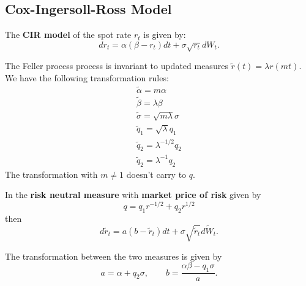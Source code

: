 \documentclass[10pt]{article}
\begin{document}
\subsection{Cox-Ingersoll-Ross Model}
\begin{outline}
  \1 The \textbf{CIR model} of the spot rate $r_t$ is given by:
  \begin{equation*}
    dr_t = \alpha(\beta - r_t)dt + \sigma\sqrt{r_t}dW_t.
  \end{equation*}

  \1 The Feller process process is invariant to updated measures
  $\tilde r(t) = \lambda r(mt)$. We have the following transformation rules:
  \begin{gather*}
    \tilde\alpha = m\alpha\\
    \tilde\beta = \lambda\beta\\
    \tilde\sigma = \sqrt{m\lambda}\sigma\\
    \tilde q_1 = \sqrt{\lambda}q_1\\
    \tilde q_2 = \lambda^{-1/2}q_2\\
    \tilde q_2 = \lambda^{-1}q_2
  \end{gather*}
  The transformation with $m\neq1$ doesn't carry to $q$.

  \1 In the \textbf{risk neutral measure} with \textbf{market price of risk} given by
  \begin{equation*}
    q = q_1 r^{-1/2} + q_2 r^{1/2}
  \end{equation*}
  then 
  \begin{equation*}
    d\tilde r_t = a(b-\tilde r_t)dt + \sigma\sqrt{\tilde r_t}d\tilde W_t.
  \end{equation*}

  \1 The transformation between the two measures is given by
  \begin{equation*}
    a = \alpha + q_2\sigma,\qquad b=\frac{\alpha\beta - q_1\sigma}{a}.
  \end{equation*}


\end{outline}
\end{document}

